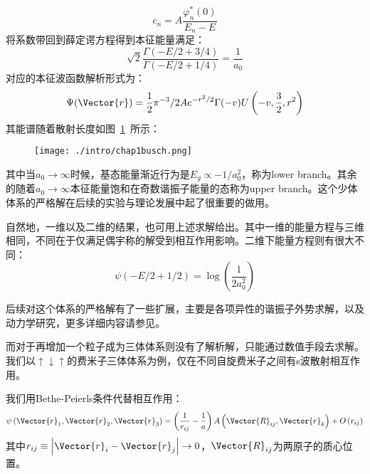\begin{equation}
c_{n}=A \frac{\varphi_{n}^{*}(0)}{E_{n}-E}
\end{equation}
将系数带回到薛定谔方程得到本征能量满足：
\begin{equation}
\sqrt{2} \frac{\Gamma(-E / 2+3 / 4)}{\Gamma(-E / 2+1 / 4)}=\frac{1}{a_{0}}
\end{equation}
对应的本征波函数解析形式为：
\begin{equation}
\Psi(\Vector{r})=\frac{1}{2} \pi^{-3} / 2 A e^{-r^{2} / 2} \Gamma(-v) U\left(-v, \frac{3}{2}, r^{2}\right)
\end{equation}
其能谱随着散射长度如图~\ref{chap1busch}~所示：
\begin{figure}[!htbp]
    \centering
    \texttt{[image: ./intro/chap1busch.png]}
    \label{chap1busch}
\end{figure}
其中当$a_0\to \infty$时候，基态能量渐近行为是$E_g\propto - 1/a_0^2$，称为lower branch。其余的随着$a_0\to\infty$本征能量饱和在奇数谐振子能量的态称为upper branch。这个少体体系的严格解在后续的实验与理论发展中起了很重要的做用。

自然地，一维以及二维的结果，也可用上述求解给出。其中一维的能量方程与三维相同，不同在于仅满足偶宇称的解受到相互作用影响。二维下能量方程则有很大不同：
\begin{equation}
\psi(-E / 2+1 / 2)=\log \left(\frac{1}{2 a_{0}^{2}}\right)
\end{equation}

后续对这个体系的严格解有了一些扩展，主要是各项异性的谐振子外势求解，以及动力学研究，更多详细内容请参见\cite{blume2012few}。

而对于再增加一个粒子成为三体体系则没有了解析解，只能通过数值手段去求解。我们以$\uparrow\downarrow\uparrow$的费米子三体体系为例，仅在不同自旋费米子之间有s波散射相互作用\cite{OlshaniiRigorous2001,Petrov2003unitary3b,Fleix2006prlunitary3b,Felix2006praunitary3b,LmDuan2007levelcrossing,Stetcu2007,Blume2008,Blume2010,Xiaji2009prl,Xiaji20103b,Rittenhouse2010green}。

我们用Bethe-Peierls条件代替相互作用：
\begin{equation}
\psi\left(\Vector{r}_{1}, \Vector{r}_{2}, \Vector{r}_{3}\right)=\left(\frac{1}{r_{i j}}-\frac{1}{a}\right) A\left(\Vector{R}_{i j}, \Vector{r}_{k}\right)+O\left(r_{i j}\right)
\end{equation}
其中$r_{i j} \equiv\left|\Vector{r}_{i}-\Vector{r}_{j}\right| \rightarrow 0$，$\Vector{R}_{ij}$为两原子的质心位置。

